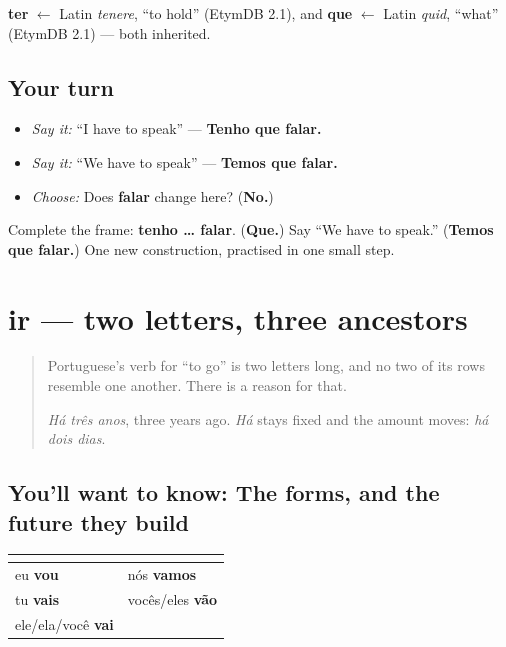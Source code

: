 \begin{cousinweb}
\textbf{ter} $\leftarrow$ Latin \emph{tenere}, \textquotedblleft{}to hold\textquotedblright{} (EtymDB 2.1), and \textbf{que} $\leftarrow$ Latin \emph{quid}, \textquotedblleft{}what\textquotedblright{} (EtymDB 2.1) — both inherited.
\end{cousinweb}

\subsection*{Your turn}
\begin{itemize}
\raggedright
  \item \emph{Say it:} “I have to speak” — \textbf{Tenho que falar.}
  \item \emph{Say it:} “We have to speak” — \textbf{Temos que falar.}
  \item \emph{Choose:} Does \textbf{falar} change here? (\textbf{No.})
\end{itemize}

\begin{tcolorbox}[breakable,colback=teal!4,colframe=teal!35!black,title={Before you move on}]
Complete the frame: \textbf{tenho … falar}. (\textbf{Que.}) Say “We have to speak.” (\textbf{Temos que falar.}) One new construction, practised in one small step.
\end{tcolorbox}
\section[ir]{ir — two letters, three ancestors}

\label{lesson:PT-C18-ir}



\begin{quote}
Portuguese's verb for \textquotedblleft{}to go\textquotedblright{} is two letters long, and no two of its rows resemble one another. There is a reason for that.

\emph{Há três anos}, three years ago. \emph{Há} stays fixed and the amount moves: \emph{há dois dias}.
\end{quote}

\subsection*{You'll want to know: The forms, and the future they build}
\noindent
\begin{tabularx}{\linewidth}{@{}>{\raggedright\arraybackslash}X>{\raggedright\arraybackslash}X@{}}
\toprule
\textbf{} & \textbf{} \\
\midrule
eu \textbf{vou} & nós \textbf{vamos} \\
tu \textbf{vais} & vocês/eles \textbf{vão} \\
ele/ela/você \textbf{vai} &  \\
\bottomrule
\end{tabularx}

